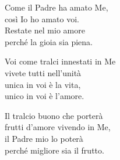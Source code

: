 

\spazio

\strofa Come il Padre ha amato Me,\\
così Io ho amato voi.\\
Restate nel mio amore\\
perché la gioia sia piena.

\spazio


\spazio

\strofa Voi come tralci innestati in Me\\
vivete tutti nell'unità\\
unica in voi è la vita,\\
unico in voi è l'amore.

\spazio


\spazio

\strofa Il tralcio buono che porterà\\
frutti d'amore vivendo in Me,\\
il Padre mio lo poterà\\
perché migliore sia il frutto.

\spazio

